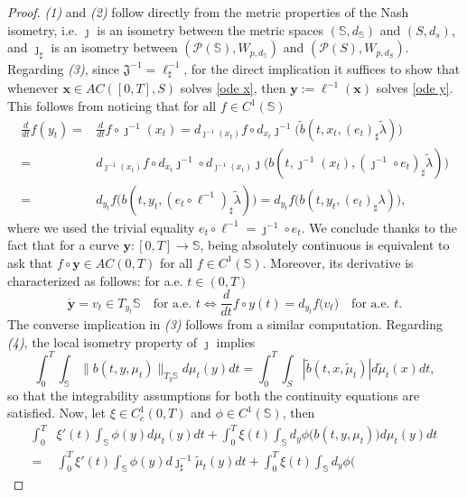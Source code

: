\documentclass[10pt,leqno]{amsart}
\numberwithin{equation}{section}
\newcommand{\PP}{\mathcal{P}}
\newcommand{\Ss}{\mathbb{S}}
\begin{document}
\begin{proof}
    \textit{(1)} and \textit{(2)} follow directly from the metric properties of the Nash isometry, i.e. $\jmath$ is an isometry between the metric spaces $(\Ss,d_\Ss)$ and $(S,d_s)$, and $\jmath_\sharp$ is an isometry between $(\PP(\Ss),W_{p,d_\Ss})$ and $(\PP(S),W_{p,d_S})$. Regarding \textit{(3)}, since $\mathfrak{J}^{-1} = \ell^{-1}_\sharp$, for the direct implication it suffices to show that whenever $\boldsymbol{x} \in AC([0,T],S)$ solves \eqref{ode x}, then $\boldsymbol{y} := \ell^{-1}(\boldsymbol{x})$ solves \eqref{ode y}. This follows from noticing that for all $f\in C^1(\Ss)$
\begin{align*}
    \frac{d}{dt}  f(y_t) = &
    \frac{d}{dt}f\circ \jmath^{-1} (x_t) 
    = 
    d_{\jmath^{-1} (x_t)}f \circ d_{x_t}\jmath^{-1} \big( \tilde{b}(t,x_t,(e_t)_\sharp\tilde\lambda) \big) 
    \\
    = &
    d_{\jmath^{-1} (x_t)}f \circ d_{x_t}\jmath^{-1} \circ d_{\jmath^{-1}(x_t)}\jmath \big( b(t, \jmath^{-1}(x_t), (\jmath^{-1} \circ e_t)_\sharp \tilde\lambda) \big)
    \\
    = &
    d_{y_t}f \big( b(t,y_t, (e_t\circ \ell^{-1})_\sharp\tilde\lambda) \big) 
    =  d_{y_t}f \big( b(t,y_t, (e_t)_\sharp\lambda) \big),
\end{align*}  
where we used the trivial  equality $e_t\circ \ell^{-1} = \jmath^{-1}\circ e_t$. We conclude thanks to the fact that for a curve $\boldsymbol{y}:[0,T]\to \Ss$, being absolutely continuous is equivalent to ask that $f\circ \boldsymbol{y} \in AC(0,T)$ for all $f\in C^1(\Ss)$. Moreover, its derivative is characterized as follows: for a.e. $t\in (0,T)$
    \[\dot{\boldsymbol{y}} = v_t \in T_{y_t}\Ss \quad\text{for a.e. }t  \iff \frac{d}{dt}f\circ y(t) = d_{y_t}f\big( v_t \big)\quad\text{for a.e. }t.\]
The converse implication in \textit{(3)} follows from a similar computation. 
Regarding \textit{(4)}, the local isometry property of $\jmath$ implies 
\[\int_0^T \int_{\Ss} \| b(t,y,\mu_t) \|_{T_y\Ss} d\mu_t(y) dt = \int_0^T \int_S |\tilde{b}(t,x,\tilde\mu_t)|d\tilde\mu_t(x) dt,\]
so that the integrability assumptions for both the continuity equations are satisfied. 
Now, let $\xi\in C_c^1(0,T)$ and $\phi\in C^1(\Ss)$, then 
\begin{align*}
    \int_0^T & \xi'(t) \int_{\Ss} \phi(y) d\mu_t(y) dt + \int_0^T \xi(t) \int_{\Ss} d_y\phi\big( 
    b(t,y,\mu_t) \big) d\mu_t(y) dt 
    \\
    = & 
    \int_0^T \xi'(t) \int_{\Ss} \phi(y) d\jmath^{-1}_\sharp\tilde\mu_t(y) dt + \int_0^T \xi(t) \int_{\Ss} d_y\phi\big( 

\end{align*}
\end{proof}
\end{document}
